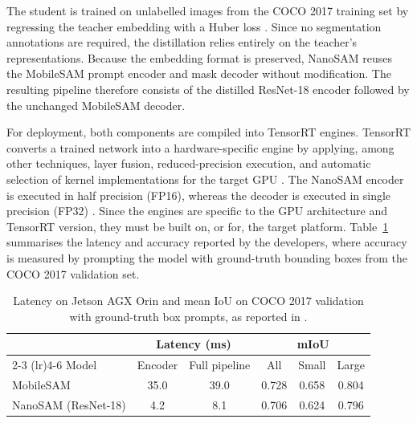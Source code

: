 {{{The student is trained on unlabelled images from the COCO 2017 training set \cite{lin2014coco} by regressing the teacher embedding with a Huber loss \cite{huber1964robust}. Since no segmentation annotations are required, the distillation relies entirely on the teacher's representations. Because the embedding format is preserved, NanoSAM reuses the MobileSAM prompt encoder and mask decoder without modification. The resulting pipeline therefore consists of the distilled ResNet-18 encoder followed by the unchanged MobileSAM decoder.

For deployment, both components are compiled into TensorRT engines. TensorRT converts a trained network into a hardware-specific engine by applying, among other techniques, layer fusion, reduced-precision execution, and automatic selection of kernel implementations for the target GPU \cite{nvidia_tensorrt}. The NanoSAM encoder is executed in half precision (FP16), whereas the decoder is executed in single precision (FP32) \cite{nanosam2023}. Since the engines are specific to the GPU architecture and TensorRT version, they must be built on, or for, the target platform. Table~\ref{tab:nanosam_performance} summarises the latency and accuracy reported by the developers, where accuracy is measured by prompting the model with ground-truth bounding boxes from the COCO 2017 validation set.
}
\begin{table}[htbp]
	\centering
	\small
	\caption{Latency on Jetson AGX Orin and mean IoU on COCO 2017 validation with ground-truth box prompts, as reported in \cite{nanosam2023}.}
	\label{tab:nanosam_performance}
	\begin{tabular}{lccccc}
		\toprule
		& \multicolumn{2}{c}{Latency (ms)} & \multicolumn{3}{c}{mIoU} \\
		\cmidrule(lr){2-3} \cmidrule(lr){4-6}
		Model & Encoder & Full pipeline & All & Small & Large \\
		\midrule
		MobileSAM           & 35.0 & 39.0 & 0.728 & 0.658 & 0.804 \\
		NanoSAM (ResNet-18) & 4.2  & 8.1  & 0.706 & 0.624 & 0.796 \\
		\bottomrule
	\end{tabular}
\end{table}

}}
